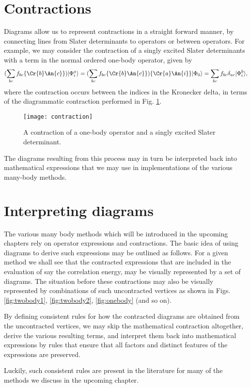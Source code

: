 \FloatBarrier

\section{Contractions}

Diagrams allow us to represent contractions in a straight
forward manner, by connecting lines from Slater determinants to operators or between
operators. For example, we may consider the contraction of a singly
excited Slater determinants with a term in the normal ordered one-body operator, given by 
\begin{equation}
( \sum_{bc} f_{bc} \{  \Cr{b} \An{c} \}) \vert \Phi_i^a \rangle = ( \sum_{bc} f_{bc} \{ \Cr{b} \An{c} \})\{ \Cr{a} \An{i} \} \vert \Phi_0 \rangle = \sum_{bc} f_{bc} \delta_{ac}  \vert \Phi_i^b \rangle,
\label{eqn:onebody_N1}
\end{equation}
where the contraction occurs between the indices in the Kronecker delta, in terms of the  diagrammatic contraction 
performed in Fig. \ref{fig:contraction}.

\begin{figure}[p]
    \centering
    \texttt{[image: contraction]}
    \caption{A contraction of a one-body operator and a singly excited Slater determinant.}
    \label{fig:contraction}
\end{figure}

The diagrams resulting from this process may in turn be interpreted
back into mathematical expressions that we may use in implementations
of the various many-body methods.


\section{Interpreting diagrams}

The various many body methods which will be introduced in the upcoming
chapters rely on operator expressions and contractions. The basic idea
of using diagrams to derive such expressions may be outlined as
follows. For a given method we shall see that the contracted
expressions that are included in the  evaluation of say the correlation energy, may
be visually represented by a set of diagrams. The situation before
these contractions may also be visually represented by combinations of
such uncontracted vertices as shown in Figs. \ref{fig:twobody1}, \ref{fig:twobody2}, \ref{fig:onebody} (and so on). 

By defining consistent
rules for how the contracted diagrams are obtained from the
uncontracted vertices, we may skip the mathematical contraction
altogether, derive the various resulting terms, and interpret them
back into mathematical expressions by rules that ensure that all
factors and distinct features of the expressions are preserved.

Luckily, such consistent rules are present in the literature
\cite{ShavittBartlett2009} for many of the methods we discuss in the
upcoming chapter.
